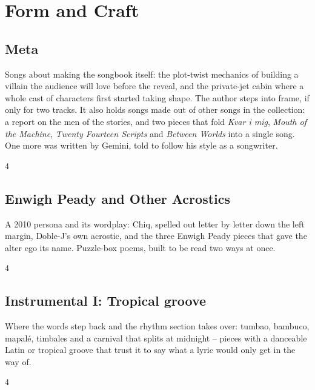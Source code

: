 \documentclass[a4paper,landscape]{memoir}
\begin{document}
\part{Form and Craft}

\chapter{Meta}
Songs about making the songbook itself: the plot-twist mechanics of building a villain the audience will love before the reveal, and the private-jet cabin where a whole cast of characters first started taking shape. The author steps into frame, if only for two tracks. It also holds songs made out of other songs in the collection: a report on the men of the stories, and two pieces that fold \emph{Kvar i mig}, \emph{Mouth of the Machine}, \emph{Twenty Fourteen Scripts} and \emph{Between Worlds} into a single song. One more was written by Gemini, told to follow his style as a songwriter.
\clearpage\begin{multicols*}{4}








\end{multicols*}

\chapter{Enwigh Peady and Other Acrostics}
A 2010 persona and its wordplay: Chiq, spelled out letter by letter down the left margin, Doble-J's own acrostic, and the three Enwigh Peady pieces that gave the alter ego its name. Puzzle-box poems, built to be read two ways at once.
\clearpage\begin{multicols*}{4}







\end{multicols*}

\chapter{Instrumental I: Tropical groove}
Where the words step back and the rhythm section takes over: tumbao, bambuco, mapalé, timbales and a carnival that splits at midnight -- pieces with a danceable Latin or tropical groove that trust it to say what a lyric would only get in the way of.
\clearpage\begin{multicols*}{4}













\end{multicols*}
\end{document}
